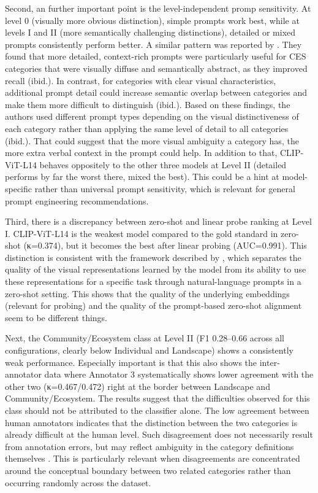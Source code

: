 \documentclass[11pt]{article}
\renewcommand{\_}{\textunderscore\allowbreak{}}
\begin{document}
Second, an further important point is the level-independent promp sensitivity. At level 0 (visually more obvious distinction), simple prompts work best, while at levels I and II (more semantically challenging distinctions), detailed or mixed prompts consistently perform better. A similar pattern was reported by \citet{liao_mapping_2025}. They found that more detailed, context-rich prompts were particularly useful for CES categories that were visually diffuse and semantically abstract, as they improved recall (ibid.). In contrast, for categories with clear visual characteristics, additional prompt detail could increase semantic overlap between categories and make them more difficult to distinguish (ibid.). Based on these findings, the authors used different prompt types depending on the visual distinctiveness of each category rather than applying the same level of detail to all categories (ibid.).
That could suggest that the more visual ambiguity a category has, the more extra verbal context in the prompt could help. In addition to that, CLIP-ViT-L14 behaves oppositely to the other three models at Level II (detailed performs by far the worst there, mixed the best). This could be a hint at model-specific rather than universal prompt sensitivity, which is relevant for general prompt engineering recommendations. 

Third, there is a discrepancy between zero-shot and linear probe ranking at Level I. CLIP-ViT-L14 is the weakest model compared to the gold standard in zero-shot (κ=0.374), but it becomes the best after linear probing (AUC=0.991). This distinction is consistent with the framework described by \citet{radford_learning_2021}, which separates the quality of the visual representations learned by the model from its ability to use these representations for a specific task through natural-language prompts in a zero-shot setting.
This shows that the quality of the underlying embeddings (relevant for probing) and the quality of the prompt-based zero-shot alignment seem to be different things. 

Next, the Community/Ecosystem class at Level II (F1 0.28–0.66 across all configurations, clearly below Individual and Landscape) shows a consistently weak performance. Especially important is that this also shows the inter-annotator data where Annotator 3 systematically shows lower agreement with the other two (κ=0.467/0.472) right at the border between Landscape and Community/Ecosystem. The results suggest that the difficulties observed for this class should not be attributed to the classifier alone. The low agreement between human annotators indicates that the distinction between the two categories is already difficult at the human level. Such disagreement does not necessarily result from annotation errors, but may reflect ambiguity in the category definitions themselves \citep{artstein_survey_2008}. This is particularly relevant when disagreements are concentrated around the conceptual boundary between two related categories rather than occurring randomly across the dataset.
\end{document}
